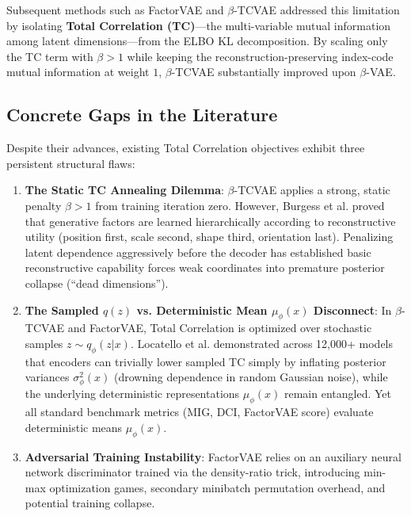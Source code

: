 \documentclass[11pt,a4paper]{article}
\begin{document}
Subsequent methods such as FactorVAE \cite{kim2018disentangling} and $\beta$-TCVAE \cite{chen2018isolating} addressed this limitation by isolating \textbf{Total Correlation (TC)}---the multi-variable mutual information among latent dimensions---from the ELBO KL decomposition. By scaling only the TC term with $\beta > 1$ while keeping the reconstruction-preserving index-code mutual information at weight $1$, $\beta$-TCVAE substantially improved upon $\beta$-VAE.

\subsection{Concrete Gaps in the Literature}
Despite their advances, existing Total Correlation objectives exhibit three persistent structural flaws:
\begin{enumerate}
    \item \textbf{The Static TC Annealing Dilemma}: $\beta$-TCVAE applies a strong, static penalty $\beta > 1$ from training iteration zero. However, Burgess et al. \cite{burgess2018understanding} proved that generative factors are learned hierarchically according to reconstructive utility (position first, scale second, shape third, orientation last). Penalizing latent dependence aggressively before the decoder has established basic reconstructive capability forces weak coordinates into premature posterior collapse (``dead dimensions'').
    \item \textbf{The Sampled $q(z)$ vs. Deterministic Mean $\mu_\phi(x)$ Disconnect}: In $\beta$-TCVAE and FactorVAE, Total Correlation is optimized over stochastic samples $z \sim q_\phi(z|x)$. Locatello et al. \cite{locatello2019challenging} demonstrated across 12,000+ models that encoders can trivially lower sampled TC simply by inflating posterior variances $\sigma_\phi^2(x)$ (drowning dependence in random Gaussian noise), while the underlying deterministic representations $\mu_\phi(x)$ remain entangled. Yet all standard benchmark metrics (MIG, DCI, FactorVAE score) evaluate deterministic means $\mu_\phi(x)$.
    \item \textbf{Adversarial Training Instability}: FactorVAE relies on an auxiliary neural network discriminator trained via the density-ratio trick, introducing min-max optimization games, secondary minibatch permutation overhead, and potential training collapse.
\end{enumerate}
\end{document}
